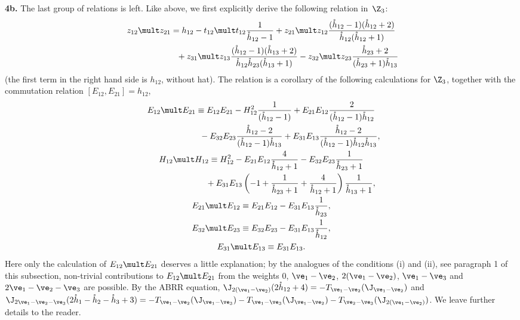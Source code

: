 \documentclass[pdftex]{sigma}
\def\nplus{\mathfrak{n}}\def\nn{\nonumber}\def\nin{\noindent}
\def\s{z}\def\S{\mathrm {S}}\def\si{\sigma}\def\Sp{\S^{\nplus}}\def\sy{\acute{\sigma}}\def\th{\mathring{h}}
\numberwithin{equation}{section}
\begin{document}
{\bf 4b.} The last group  of relations is left. Like above, we f\/irst explicitly derive the following relation in~$\Z_3$:
\begin{gather} \s_{12}\mult \s_{21}=  h_{12}-t_{12}\mult t_{12}  \frac{1}{\th_{12}-1}+\s_{21}\mult\s_{12}
\frac{(\th_{12}-1)(\th_{12} +2)}{\th_{12}(\th_{12} +1)}\nonumber\\
\phantom{\s_{12}\mult \s_{21}=}{} +  \s_{31}\mult\s_{13} \frac{(\th_{12}-1) (\th_{13} +2)}{\th_{12}\th_{23}(\th_{13}+1)}
-\s_{32}\mult\s_{23}  \frac{\th_{23} +2}{(\th_{23} +1)\th_{13}}  \label{re01}
\end{gather}
(the f\/irst term in the right hand side is $h_{12}$, without hat). The relation  is a corollary of the following calculations
for $\Z_3$, together with the commutation relation $[E_{12},E_{21}]=h_{12}$,
\begin{gather}E_{12}\mult E_{21}\equiv   E_{12}E_{21}-H_{12}^2 \frac{1}{(\th_{12}-1)}
+E_{21}E_{12} \frac{2}{(\th_{12}-1)\th_{12}}\nonumber\\
\phantom{E_{12}\mult E_{21}\equiv}{} - E_{32}E_{23} \frac{\th_{12} -2}{(\th_{12}-1)\th_{13}}+
E_{31}E_{13} \frac{\th_{12} -2}{(\th_{12}-1)\th_{12}\th_{13}} ,\label{zemod1}\\
 H_{12}\mult H_{12}\equiv   H_{12}^2-E_{21}E_{12} \frac{4}{\th_{12} +1}
-E_{32}E_{23} \frac{1}{\th_{23} +1}\nonumber\\
\phantom{H_{12}\mult H_{12}\equiv}{} +  E_{31}E_{13}\left(-1+\frac{1}{\th_{23} +1}+\frac{4}{\th_{12} +1}\right)\frac{1}{\th_{13}+1} ,\label{zemod2}\\
E_{21}\mult E_{12}\equiv E_{21}E_{12}-E_{31}E_{13} \frac{1}{\th_{23}} ,\label{zemod3}\\
 E_{32}\mult E_{23}\equiv  E_{32}E_{23}-E_{31}E_{13} \frac{1}{\th_{12}} ,\label{zemod4}\\
 E_{31}\mult E_{13}\equiv  E_{31}E_{13} .\label{zemod5}
 \end{gather}
Here only the calculation of $E_{12}\mult E_{21}$ deserves a little explanation; by  the analogues of the conditions (i) and (ii),
see paragraph 1 of this subsection, non-trivial contributions to $E_{12}\mult E_{21}$ from the weights 0,
$\ve_1-\ve_2$, $2(\ve_1-\ve_2)$, $\ve_1-\ve_3$ and $2\ve_1-\ve_2-\ve_3$ are possible. By the ABRR equation,
$\J_{2(\ve_1-\ve_2)}(2\th_{12}+4)=-T_{\ve_1-\ve_2}(\J_{\ve_1-\ve_2})$ and $\J_{2\ve_1-\ve_2-\ve_3}
(2\th_1-\th_2-\th_3+3)=-T_{\ve_1-\ve_2}(\J_{\ve_1-\ve_3})-T_{\ve_1-\ve_3}(\J_{\ve_1-\ve_2})-T_{\ve_2-\ve_3}
(\J_{2(\ve_1-\ve_2)})$. We leave further details to the reader.
\end{document}
